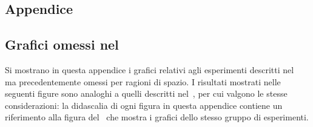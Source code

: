 
\begin{appendices}
\chapter*{Appendice}\label{appendix}
\section*{Grafici omessi nel~}
Si mostrano in questa appendice i grafici relativi agli esperimenti descritti nel~ ma precedentemente omessi per ragioni di spazio.
I risultati mostrati nelle seguenti figure sono analoghi a quelli descritti nel~, per cui valgono le stesse considerazioni: la didascalia di ogni figura in questa appendice contiene un riferimento alla figura del~ che mostra i grafici dello stesso gruppo di esperimenti.


\end{appendices}
